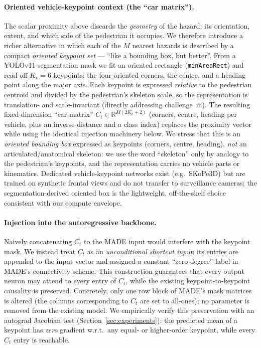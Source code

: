 \documentclass{article}
\begin{document}
\paragraph{Oriented vehicle-keypoint context (the ``car matrix'').}
The scalar proximity above discards the \emph{geometry} of the hazard: its
orientation, extent, and which side of the pedestrian it occupies. We
therefore introduce a richer alternative in which each of the $M$ nearest
hazards is described by a compact \emph{oriented keypoint set} --- ``like a
bounding box, but better''. From a YOLOv11-segmentation mask we fit an
oriented rectangle (\texttt{minAreaRect}) and read off $K_v=6$ keypoints: the
four oriented corners, the centre, and a heading point along the major axis.
Each keypoint is expressed \emph{relative} to the pedestrian centroid and
divided by the pedestrian's skeleton scale, so the representation is
translation- and scale-invariant (directly addressing challenge~iii). The
resulting fixed-dimension ``car matrix''
$C_t\in\mathbb{R}^{M(2K_v+2)}$ (corners, centre, heading per vehicle, plus an
inverse-distance and a class index) replaces the proximity vector while using
the identical injection machinery below. We stress that this is an
\emph{oriented bounding box} expressed as keypoints (corners, centre, heading),
\emph{not} an articulated/anatomical skeleton: we use the word ``skeleton'' only
by analogy to the pedestrian's keypoints, and the representation carries no
vehicle parts or kinematics. Dedicated vehicle-keypoint networks exist (e.g.\
SKoPe3D) but are trained on synthetic frontal views and do not transfer to
surveillance cameras; the segmentation-derived oriented box is the lightweight,
off-the-shelf choice consistent with our compute envelope.

\paragraph{Injection into the autoregressive backbone.}
Naively concatenating $C_t$ to the MADE input would interfere with the
keypoint mask. We instead treat $C_t$ as an \emph{unconditional shortcut
input}: its entries are appended to the input vector and assigned a
constant ``zero-degree'' label in MADE's connectivity scheme. This
construction guarantees that every output neuron may attend to every entry
of $C_t$, while the existing keypoint-to-keypoint causality is preserved.
Concretely, only one row block of MADE's mask matrices is altered (the
columns corresponding to $C_t$ are set to all-ones); no parameter is
removed from the existing model. We empirically verify this preservation
with an autograd Jacobian test (Section~\ref{sec:experiments}): the predicted
mean of a keypoint has \emph{zero} gradient w.r.t.\ any equal- or
higher-order keypoint, while every $C_t$ entry is reachable.
\end{document}
